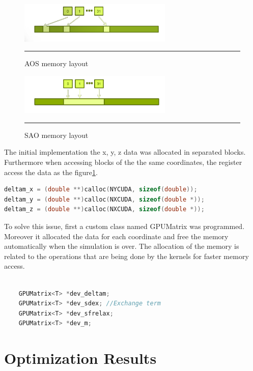 \begin{figure}[htbp]
	\centering
		\includegraphics[width=0.65\textwidth]{Figures/aos.png}
		\rule{35em}{0.2pt}
	\caption[Array of structures (AOS)]{AOS memory layout }
	\label{fig:aos}
\end{figure}


\begin{figure}[htbp]
	\centering
		\includegraphics[width=0.65\textwidth]{Figures/soa.png}
		\rule{35em}{0.2pt}
	\caption[Structure of Arrays (SAO)]{SAO memory layout}
	\label{fig:sao}
\end{figure}


The initial implementation the  x, y, z data was allocated in separated blocks. Furthermore when accessing blocks of the the same coordinates, the register access the data as the figure\ref{fig:aos}.

\begin{lstlisting}[language=C++, caption={AOS implementation}]
deltam_x = (double **)calloc(NYCUDA, sizeof(double));
deltam_y = (double **)calloc(NXCUDA, sizeof(double *));
deltam_z = (double **)calloc(NXCUDA, sizeof(double *));
\end{lstlisting}

To solve this issue, first a custom class named GPUMatrix was programmed. Moreover it allocated the data for each coordinate and free the memory automatically when the simulation is over. The allocation of the memory is related to the operations that are being done by the kernels for faster memory access. 

\begin{lstlisting}[language=C++, caption={SOA implementation}]

    GPUMatrix<T> *dev_deltam;
    GPUMatrix<T> *dev_sdex; //Exchange term
    GPUMatrix<T> *dev_sfrelax;
    GPUMatrix<T> *dev_m; 
\end{lstlisting}


\section{Optimization Results}






